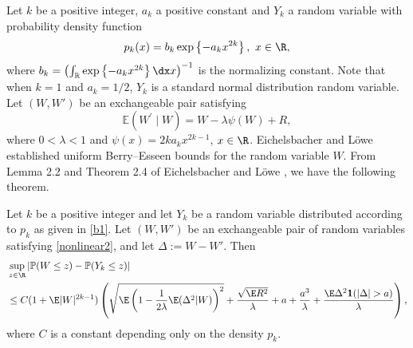 	Let $k$ be a positive integer, $a_k$ a positive constant and
	$Y_k$ a random variable with probability  density function
	\begin{equation}\label{b1}
		p_k(x)= b_k \exp\left\{-a_k x^{2k}\right\},\text{ } x\in\R,
	\end{equation}
	where $b_k = \left(\int_{\mathbb{R}} \exp\left\{-a_k x^{2k}\right\}\dx x \right)^{-1}$ is the normalizing constant.
	Note that when $k=1$ and $a_k=1/2$, $Y_k$ is a standard normal distribution random variable.
	Let $(W, W')$ be an exchangeable pair satisfying
	\begin{equation}\label{nonlinear2}
		\mathbb{E}\left(W^{\prime} \mid W\right)=  W-\lambda \psi(W) + R,
	\end{equation}
	where $0<\lambda<1$ and $\psi(x)=2ka_kx^{2k-1}$, $x\in \R$.
Eichelsbacher and L\"{o}we \cite{eichelsbacher2010stein}
	established uniform Berry--Esseen bounds for the random variable $W$. From Lemma 2.2 and Theorem 2.4 of Eichelsbacher and L\"{o}we \cite{eichelsbacher2010stein},
	we have the following theorem.
	
	\begin{theorem}\label{thm.eichelsbacher2010}
		Let $k$ be a positive integer and let $Y_k$ be a random variable distributed according to $p_k$ as given in \eqref{b1}. 
		Let $(W, W')$ be an exchangeable pair of random variables satisfying \eqref{nonlinear2}, and let $\Delta := W - W'$. 
		Then 
		\begin{equation*}\label{eiche15}		
			\begin{split}
				&\sup_{z\in\R}\left| \mathbb{P}(W \le z) - \mathbb{P}(Y_k \le z) \right|\\
				&\le 
				C(1+\E|W|^{2k-1})\left( \sqrt{\E\left( 1- \frac{1}{2\lambda}\E({\Delta}^2|W)\right)^2 } +\dfrac{\sqrt{\E R^2}}{\lambda} 
				+  a +\frac{a^3}{\lambda}+ \dfrac{\E\Delta^2\mathbf{1}(|\Delta|>a)}{\lambda}\right),
			\end{split}	
		\end{equation*}
		where $C$ is a constant depending only on the density $p_k$.
	\end{theorem}
	
